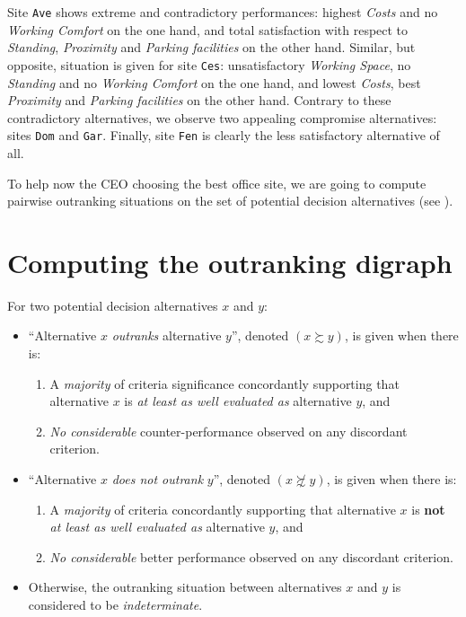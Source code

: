Site \texttt{Ave} shows extreme and contradictory performances: highest \emph{Costs} and no \emph{Working Comfort} on the one hand, and total satisfaction with respect to \emph{Standing}, \emph{Proximity} and \emph{Parking facilities} on the other hand. Similar, but opposite, situation is given for site \texttt{Ces}: unsatisfactory \emph{Working Space}, no \emph{Standing} and no \emph{Working Comfort} on the one hand, and lowest \emph{Costs}, best \emph{Proximity} and \emph{Parking facilities} on the other hand. Contrary to these contradictory alternatives, we observe two appealing compromise alternatives: sites \texttt{Dom} and \texttt{Gar}. Finally, site \texttt{Fen} is clearly the less satisfactory alternative of all.

To help now the CEO choosing the best office site, we are going to compute pairwise outranking situations on the set of potential decision alternatives (see \citealp{BIS-2013}).

\section{Computing the outranking digraph}
\label{sec:4.3}

\begin{definition}\label{def:outranking}

\noindent For two potential decision alternatives $x$ and $y$:
\begin{itemize}[leftmargin=0.5cm,rightmargin=0.5cm]
\item ``Alternative $x$ \emph{outranks} alternative $y$'', denoted $(x \succsim y)$, is given when there is:
   \begin{enumerate}
     \item A \emph{majority} of criteria significance concordantly supporting that alternative $x$ is \emph{at least as well evaluated as} alternative $y$, and
     \item \emph{No considerable} counter-performance observed on any discordant criterion.      
    \end{enumerate}
\item ``Alternative $x$ \emph{does not outrank} $y$'', denoted $(x \not\succsim y)$, is given when there is:
   \begin{enumerate}
    \item A \emph{majority} of criteria concordantly supporting that alternative $x$ is \textbf{not} \emph{at least as well evaluated as} alternative $y$, and
    \item \emph{No considerable} better performance observed on any discordant criterion. 
    \end{enumerate}
\item Otherwise, the outranking situation between alternatives $x$ and $y$ is considered to be \emph{indeterminate}.
\end{itemize}
\end{definition}

